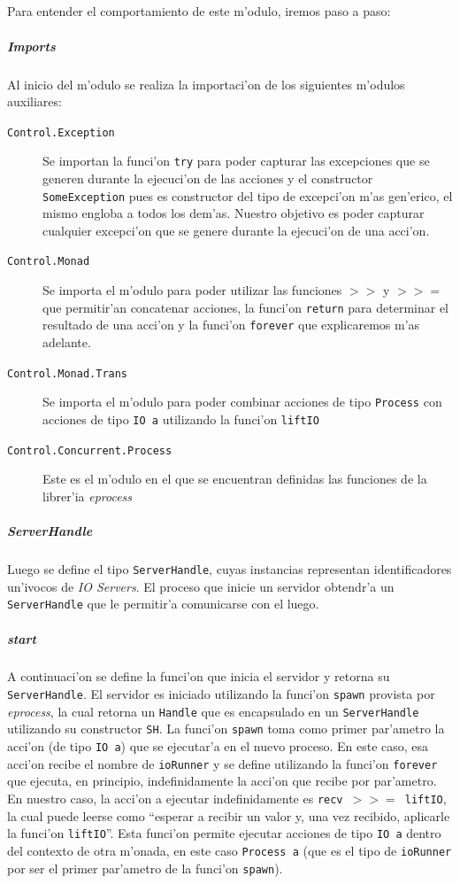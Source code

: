 \documentclass[a4paper]{article}
\begin{document}
\subparagraph{}Para entender el comportamiento de este m'odulo, iremos paso a paso:
\subparagraph{Imports} Al inicio del m'odulo se realiza la importaci'on de los siguientes m'odulos auxiliares:
\begin{description}
	\item[\texttt{Control.Exception}] Se importan la funci'on \texttt{try} para poder capturar las excepciones que se generen durante la ejecuci'on de las acciones y el constructor \texttt{SomeException} pues es constructor del tipo de excepci'on m'as gen'erico, el mismo engloba a todos los dem'as.  Nuestro objetivo es poder capturar cualquier excepci'on que se genere durante la ejecuci'on de una acci'on.
	\item[\texttt{Control.Monad}] Se importa el m'odulo para poder utilizar las funciones \texttt{$>>$} y \texttt{$>>=$} que permitir'an concatenar acciones, la funci'on \texttt{return} para determinar el resultado de una acci'on y la funci'on \texttt{forever} que explicaremos m'as adelante.
	\item[\texttt{Control.Monad.Trans}] Se importa el m'odulo para poder combinar acciones de tipo \texttt{Process} con acciones de tipo \texttt{IO a} utilizando la funci'on \texttt{liftIO}
	\item[\texttt{Control.Concurrent.Process}] Este es el m'odulo en el que se encuentran definidas las funciones de la librer'ia \textsl{eprocess}
\end{description}
\subparagraph{ServerHandle}Luego se define el tipo \texttt{ServerHandle}, cuyas instancias representan identificadores un'ivocos de \textsl{IO Servers}.  El proceso que inicie un servidor obtendr'a un \texttt{ServerHandle} que le permitir'a comunicarse con el luego.
\subparagraph{start}A continuaci'on se define la funci'on que inicia el servidor y retorna su \texttt{ServerHandle}.  El servidor es iniciado utilizando la funci'on \texttt{spawn} provista por \textsl{eprocess}, la cual retorna un \texttt{Handle} que es encapsulado en un \texttt{ServerHandle} utilizando su constructor \texttt{SH}.  La funci'on \texttt{spawn} toma como primer par'ametro la acci'on (de tipo \texttt{IO a}) que se ejecutar'a en el nuevo proceso.  En este caso, esa acci'on recibe el nombre de \texttt{ioRunner} y se define utilizando la funci'on \texttt{forever} que ejecuta, en principio, indefinidamente la acci'on que recibe por par'ametro.  En nuestro caso, la acci'on a ejecutar indefinidamente es \texttt{recv $>>=$ liftIO}, la cual puede leerse como ``esperar a recibir un valor y, una vez recibido, aplicarle la funci'on \texttt{liftIO}''.  Esta funci'on permite ejecutar acciones de tipo \texttt{IO a} dentro del contexto de otra m'onada, en este caso \texttt{Process a} (que es el tipo de \texttt{ioRunner} por ser el primer par'ametro de la funci'on \texttt{spawn}).
\end{document}
